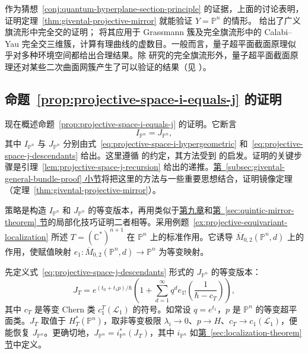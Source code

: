 作为猜想~\ref{conj:quantum-hyperplane-section-principle} 的证据，上面的讨论表明，证明定理~\ref{thm:givental-projective-mirror} 就能验证 $Y=\mathbb P^n$ 的情形。 给出了广义旗流形中完全交的证明； 将其应用于 Grassmann 簇及完全旗流形中的 Calabi--Yau 完全交三维簇，计算有理曲线的虚数目。一般而言，量子超平面截面原理似乎对多种环境空间都给出合理结果。除  研究的完全旗流形外，量子超平面截面原理还对某些二次曲面网簇产生了可以验证的结果（见 ）。

\subsection{命题~\ref{prop:projective-space-i-equals-j} 的证明}\label{subsec:givental-projective-space-proof}
现在概述命题~\ref{prop:projective-space-i-equals-j} 的证明。它断言
\[
I_{\mathbb P^n}=J_{\mathbb P^n},
\]
其中 $I_{\mathbb P^n}$ 与 $J_{\mathbb P^n}$ 分别由式~\eqref{eq:projective-space-i-hypergeometric} 和~\eqref{eq:projective-space-j-descendants} 给出。这里遵循  的约定，其方法受到  的启发。证明的关键步骤是引理~\ref{lem:projective-space-j-recursion} 给出的递推。\hyperref[subsec:givental-general-bundle-proof]{第~\ref*{subsec:givental-general-bundle-proof} 小节}将把这里的方法与一些重要思想结合，证明镜像定理（定理~\ref{thm:givental-projective-mirror}）。

策略是构造 $I_{\mathbb P^n}$ 和 $J_{\mathbb P^n}$ 的等变版本，再用类似于\hyperref[chap:localization]{第九章}和\hyperref[sec:quintic-mirror-theorem]{第~\ref*{sec:quintic-mirror-theorem} 节}的局部化技巧证明二者相等。采用例题~\ref{ex:projective-equivariant-localization} 所述 $T=(\mathbb C^*)^{n+1}$ 在 $\mathbb P^n$ 上的标准作用。它诱导 $\overline M_{0,2}(\mathbb P^n,d)$ 上的作用，使赋值映射 $e_1:\overline M_{0,2}(\mathbb P^n,d)\to\mathbb P^n$ 为等变映射。

先定义式~\eqref{eq:projective-space-j-descendants} 形式的 $J_{\mathbb P^n}$ 的等变版本：
\begin{equation}\label{eq:projective-space-equivariant-j}
J_T=e^{(t_0+t_1p)/\hbar}\left(1+\sum_{d=1}^{\infty}q^d e_{1!}\left(\frac1{\hbar-c_T}\right)\right),
\end{equation}
其中 $c_T$ 是等变 Chern 类 $c_1^T(\mathcal L_1)$ 的符号。如常设 $q=e^{t_1}$，$p$ 是 $\mathbb P^n$ 的等变超平面类。$J_T$ 取值于 $H_T^*(\mathbb P^n)$，取非等变极限 $\lambda_i\to0$、$p\to H$、$c_T\to c_1(\mathcal L_1)$，便能恢复 $J_{\mathbb P^n}$。更确切地，$J_{\mathbb P^n}=i_{\mathbb P^n}^*(J_T)$，其中 $i_{\mathbb P^n}$ 如\hyperref[sec:localization-theorem]{第~\ref*{sec:localization-theorem} 节}中定义。

